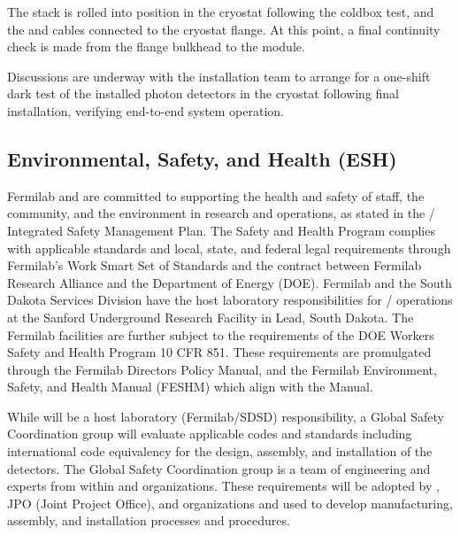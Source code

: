 The  stack is rolled into position in the cryostat following the coldbox test, and the  and  cables connected to the cryostat flange.  At this point, a final continuity check is made from the flange bulkhead to the  module.

Discussions are underway with the installation team to arrange for a one-shift dark test of the installed photon detectors in the cryostat following final installation, verifying end-to-end system operation.



\subsection{Environmental, Safety, and Health (ESH)}
\label{sec:fdsp-tc-inst-safety}

Fermilab and  are committed to supporting the health and safety of staff, the community, and the environment in research and operations, as stated in the / Integrated Safety Management Plan. The Safety and Health Program complies with applicable standards and local, state, and federal legal requirements through Fermilab's Work Smart Set of Standards and the contract between Fermilab Research Alliance and the Department of Energy (DOE). Fermilab and the South Dakota Services Division have the host laboratory responsibilities for / operations at the Sanford Underground Research Facility in Lead, South Dakota.
The Fermilab facilities are further subject to the requirements of the DOE Workers Safety and Health Program 10 CFR 851. These requirements are promulgated through the Fermilab Directors Policy Manual, and the Fermilab Environment, Safety, and Health Manual (FESHM) which align with the   Manual.

While  will be  a host laboratory (Fermilab/SDSD) responsibility, a  Global Safety Coordination group will evaluate applicable codes and standards including international code equivalency for the design, assembly, and installation of the  detectors. The Global Safety Coordination group is  a team of engineering and  experts from within  and  organizations.  These requirements will be adopted by , JPO (Joint Project Office), and  organizations and used to develop manufacturing, assembly, and installation processes and procedures. 

